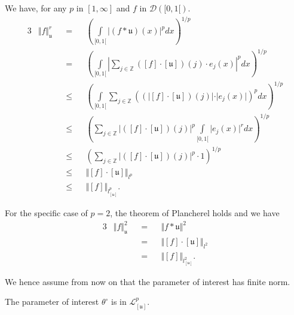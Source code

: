 We have, for any $p$ in $[1 ,\infty]$ and $f$ in $\mathcal{D}([0, 1[)$.
\begin{alignat*}{3}
&\Vert f \Vert^{r}_{\mathfrak{u}} &&=&& \left(\int\limits_{[0, 1[} \vert (f*\mathfrak{u})(x)\vert^{p} dx\right)^{1/p}\\
& &&=&& \left(\int\limits_{[0, 1[} \left\vert \sum\limits_{j \in \mathds{Z}}([f]\cdot [\mathfrak{u}])(j) \cdot e_{j}(x)\right\vert^{p} dx\right)^{1/p}\\
& &&\leq&& \left(\int\limits_{[0, 1[} \sum\limits_{j \in \mathds{Z}}\left((\vert[f]\cdot [\mathfrak{u}])(j)\vert \cdot \vert e_{j}(x)\vert\right)^{p} dx\right)^{1/p}\\
& &&\leq&& \left(\sum\limits_{j \in \mathds{Z}}\vert ([f]\cdot[\mathfrak{u}])(j)\vert^{p}\int\limits_{[0, 1[} \vert e_{j}(x)\vert^{r} dx\right)^{1/p}\\
& &&\leq&& \left(\sum\limits_{j \in \mathds{Z}}\vert ([f] \cdot [\mathfrak{u}])(j)\vert^{p}\cdot 1\right)^{1/p}\\
& &&\leq&& \Vert[f]\cdot [\mathfrak{u}]\Vert_{l^{p}}\\
& &&\leq&& \Vert[f]\Vert_{l^{p}_{[\mathfrak{u}]}}.
\end{alignat*}

For the specific case of $p=2$, the theorem of Plancherel holds and we have
\begin{alignat*}{3}
&\Vert f \Vert^{2}_{\mathfrak{u}} &&=&& \Vert f * \mathfrak{u} \Vert^{2}\\
& &&=&& \Vert [f] \cdot [\mathfrak{u}]\Vert_{l^{2}}\\
& &&=&& \Vert [f] \Vert_{l_{[\mathfrak{u}]}^{2}}.
\end{alignat*}

We hence assume from now on that the parameter of interest has finite norm.

\begin{as}\label{as1.4.1}
The parameter of interest $\theta^{\circ}$ is in $\mathcal{L}_{[\mathfrak{u}]}^{p}$.
\end{as}